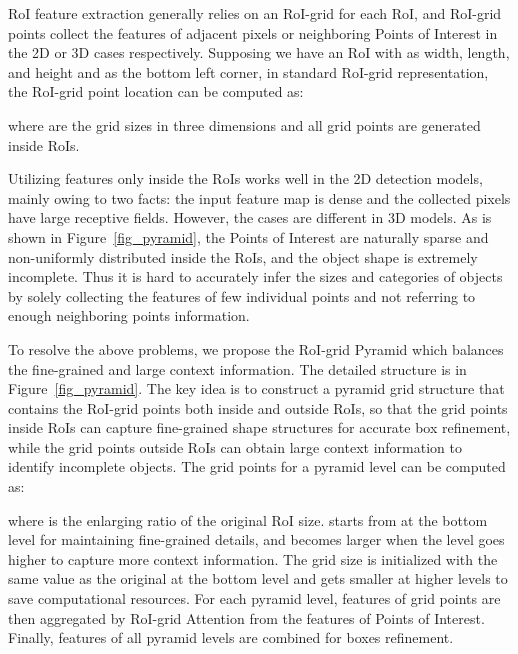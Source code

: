 \documentclass[10pt,twocolumn,letterpaper]{article}
\begin{document}
RoI feature extraction generally relies on an RoI-grid for each RoI, and RoI-grid points collect the features of adjacent pixels or neighboring Points of Interest in the 2D or 3D cases respectively. Supposing we have an RoI with  as width, length, and height and  as the bottom left corner, in standard RoI-grid representation, the  RoI-grid point location  can be computed as:

where  are the grid sizes in three dimensions and all grid points are generated inside RoIs. 

Utilizing features only inside the RoIs works well in the 2D detection models, mainly owing to two facts: the input feature map is dense and the collected pixels have large receptive fields. However, the cases are different in 3D models. As is shown in Figure~\ref{fig_pyramid}, the Points of Interest are naturally sparse and non-uniformly distributed inside the RoIs, and the object shape is extremely incomplete. Thus it is hard to accurately infer the sizes and categories of objects by solely collecting the features of few individual points and not referring to enough neighboring points information. 

To resolve the above problems, we propose the RoI-grid Pyramid which balances the fine-grained and large context information. The detailed structure is in Figure~\ref{fig_pyramid}. The key idea is to construct a pyramid grid structure that contains the RoI-grid points both inside and outside RoIs, so that the grid points inside RoIs can capture fine-grained shape structures for accurate box refinement, while the grid points outside RoIs can obtain large context information to identify incomplete objects. The grid points  for a pyramid level can be computed as:

where  is the enlarging ratio of the original RoI size.  starts from  at the bottom level for maintaining fine-grained details, and becomes larger when the level goes higher to capture more context information. The grid size  is initialized with the same value as the original  at the bottom level and gets smaller at higher levels to save computational resources. For each pyramid level, features of grid points  are then aggregated by RoI-grid Attention from the features of Points of Interest. Finally, features of all pyramid levels are combined for boxes refinement. 
\end{document}
